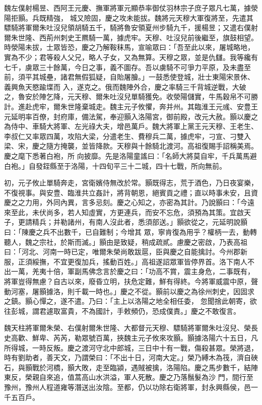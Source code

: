 \begin{pinyinscope}
 魏左僕射楊昱、西阿王元慶、撫軍將軍元顯恭率御仗羽林宗子庶子眾凡七萬，據滎陽拒顥。兵既精強，
 城又險固，慶之攻未能拔。魏將元天穆大軍復將至，先遣其驃騎將軍爾朱吐沒兒領胡騎五千，騎將魯安領夏州步騎九千，援楊昱；又遣右僕射爾朱世隆、西荊州刺史王羆騎一萬，據虎牢。天穆、吐沒兒前後繼至，旗鼓相望。時滎陽未拔，士眾皆恐，慶之乃解鞍秣馬，宣喻眾曰：「吾至此以來，屠城略地，實為不少；君等殺人父兄，略人子女，又為無算。天穆之眾，並是仇讎。我等纔有七千，虜眾三十餘萬，今日之事，義不圖存。吾以虜騎不可爭力平原，及未盡至前，須平其城壘，諸君無假狐疑，自貽屠膾。」一鼓悉使登城，壯士東陽宋景休、義興魚天愍踰堞而
 入，遂克之。俄而魏陣外合，慶之率騎三千背城逆戰，大破之，魯安於陣乞降，元天穆、爾朱吐沒兒單騎獲免。收滎陽儲實，牛馬穀帛不可勝計。進赴虎牢，爾朱世隆棄城走。魏主元子攸懼，奔并州。其臨淮王元彧、安豊王元延明率百僚，封府庫，備法駕，奉迎顥入洛陽宮，御前殿，改元大赦。顥以慶之為侍中、車騎大將軍、左光祿大夫，增邑萬戶。魏大將軍上黨王元天穆、王老生、李叔仁又率眾四萬，攻陷大梁，分遣老生、費穆兵二萬，據虎牢，刁宣、刁雙入梁、宋，慶之隨方掩襲，並皆降款。天穆與十餘騎北渡河。高祖復賜手詔稱美焉。慶之麾下悉著白袍，所
 向披靡。先是洛陽童謠曰：「名師大將莫自牢，千兵萬馬避白袍。」自發銍縣至于洛陽，十四旬平三十二城，四十七戰，所向無前。



 初，元子攸止單騎奔走，宮衛嬪侍無改於常。顥既得志，荒于酒色，乃日夜宴樂，不復視事。與安豊、臨淮共立姦計，將背朝恩，絕賓貢之禮；直以時事未安，且資慶之之力用，外同內異，言多忌刻。慶之心知之，亦密為其計。乃說顥曰：「今遠來至此，未伏尚多，若人知虛實，方更連兵，而安不忘危，須預為其策。宜啟天子，更請精兵；并勒諸州，有南人沒此者，悉須部送。」顥欲從之，元延明說顥曰：「陳慶之兵不出數千，已自難制；今增其
 眾，寧肯復為用乎？權柄一去，動轉聽人，魏之宗社，於斯而滅。」顥由是致疑，稍成疏貳。慮慶之密啟，乃表高祖曰：「河北、河南一時已定，唯爾朱榮尚敢跋扈，臣與慶之自能擒討。今州郡新服，正須綏撫，不宜更復加兵，搖動百姓。」高祖遂詔眾軍皆停界首。洛下南人不出一萬，羌夷十倍，軍副馬佛念言於慶之曰：「功高不賞，震主身危，二事既有，將軍豈得無慮？自古以來，廢昏立明，扶危定難，鮮有得終。今將軍威震中原，聲動河塞，屠顥據洛，則千載一時也。」慶之不從。顥前以慶之為徐州刺史，因固求之鎮。顥心憚之，遂不遣。乃曰：「主上以洛陽之地全相任委，
 忽聞捨此朝寄，欲往彭城，謂君遽取富貴，不為國計，手敕頻仍，恐成僕責。」慶之不敢復言。



 魏天柱將軍爾朱榮、右僕射爾朱世隆、大都督元天穆、驃騎將軍爾朱吐沒兒、榮長史高歡、鮮卑、芮芮，勒眾號百萬，挾魏主元子攸來攻顥。顥據洛陽六十五日，凡所得城，一時反叛。慶之渡河守北中郎城，三日中十有一戰，傷殺甚眾。榮將退，時有劉助者，善天文，乃謂榮曰：「不出十日，河南大定。」榮乃縛木為筏，濟自硤石，與顥戰於河橋，顥大敗，走至臨潁，遇賊被擒，洛陽陷。慶之馬步數千，結陣東反，榮親自來追，值蒿高山水洪溢，軍人死散。慶之乃落鬚髮為沙
 門，間行至豫州，豫州人程道雍等潛送出汝陰。至都，仍以功除右衛將軍，封永興縣侯，邑一千五百戶。




\end{pinyinscope}
